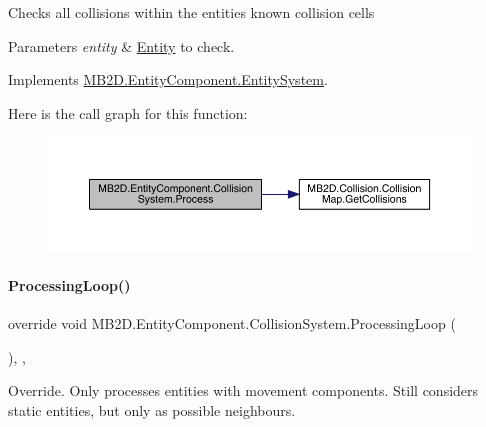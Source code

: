 Checks all collisions within the entities known collision cells 


\begin{DoxyParams}{Parameters}
{\em entity} & \hyperlink{class_m_b2_d_1_1_entity_component_1_1_entity}{Entity} to check.\\
\hline
\end{DoxyParams}


Implements \hyperlink{class_m_b2_d_1_1_entity_component_1_1_entity_system_abbf83b87cb5d12754fb058cef50451fa}{M\+B2\+D.\+Entity\+Component.\+Entity\+System}.

Here is the call graph for this function\+:
\nopagebreak
\begin{figure}[H]
\begin{center}
\leavevmode
\includegraphics[width=350pt]{class_m_b2_d_1_1_entity_component_1_1_collision_system_adfbee070ed7b120565a5f8a08c159535_cgraph}
\end{center}
\end{figure}
\hypertarget{class_m_b2_d_1_1_entity_component_1_1_collision_system_a06249adc606475cdc35f28783a1b27c4}{}\label{class_m_b2_d_1_1_entity_component_1_1_collision_system_a06249adc606475cdc35f28783a1b27c4} 
\paragraph{\texorpdfstring{Processing\+Loop()}{ProcessingLoop()}}
{\footnotesize\ttfamily override void M\+B2\+D.\+Entity\+Component.\+Collision\+System.\+Processing\+Loop (\begin{DoxyParamCaption}{ }\end{DoxyParamCaption})\hspace{0.3cm}{\ttfamily [inline]}, {\ttfamily [protected]}, {\ttfamily [virtual]}}



Override. Only processes entities with movement components. Still considers static entities, but only as possible neighbours. 



